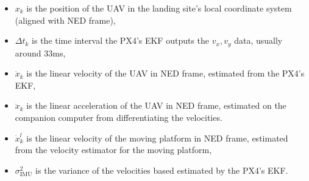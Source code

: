 \documentclass[conference, onecolumn, draftclsnofoot]{IEEEtran}
\begin{document}
\begin{itemize}
\item  \(x_k \) is the position of the UAV in the landing site's local 
coordinate system (aligned with NED frame), 
\item \(\Delta t_k\) is the time interval the PX4's EKF outputs the \(v_x, v_y\) data, 
usually around 33ms, 
\item \(\dot{x}_k\) is the linear velocity of the UAV in NED frame, 
estimated from the PX4's EKF,

\item \(\ddot{x}_k\) is the linear acceleration of the UAV in NED frame, 
estimated on the companion computer from differentiating the velocities.


\item \(\dot{x}_k^l\) is the linear 
velocity of the moving platform in NED frame, estimated from the velocity 
estimator for the moving platform,


\item \(\sigma^{2}_{\textrm{IMU}}\) is the variance of the velocities based 
estimated by the PX4's EKF.
\end{itemize}

\end{document}
